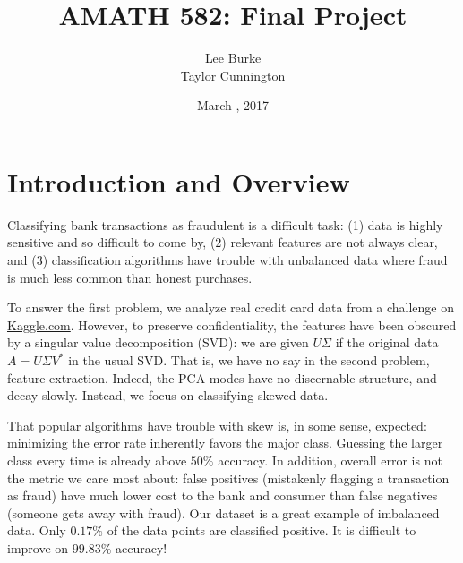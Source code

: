 \documentclass{article}
\title{AMATH 582: Final Project}
\date{March \nth{16}, 2017}
\author{Lee Burke \\ Taylor Cunnington}
\begin{document}
\maketitle
{}
\section{Introduction and Overview}
Classifying bank transactions as fraudulent is a difficult task: (1) data is highly sensitive and so difficult to come by, (2) relevant features are not always clear, and (3) classification algorithms have trouble with unbalanced data where fraud is much less common than honest purchases.

To answer the first problem, we analyze real credit card data from a challenge on \href{kaggle.com}{Kaggle.com}. However, to preserve confidentiality, the features have been obscured by a singular value decomposition (SVD): we are given $U\Sigma$ if the original data $A=U\Sigma V^\ast$ in the usual SVD. That is, we have no say in the second problem, feature extraction. Indeed, the PCA modes have no discernable structure, and decay slowly. Instead, we focus on classifying skewed data.

That popular algorithms have trouble with skew is, in some sense, expected: minimizing the error rate inherently favors the major class. Guessing the larger class every time is already above $50\%$ accuracy. In addition, overall error is not the metric we care most about: false positives (mistakenly flagging a transaction as fraud) have much lower cost to the bank and consumer than false negatives (someone gets away with fraud). Our dataset is a great example of imbalanced data. Only $0.17\%$ of the data points are classified positive. It is difficult to improve on $99.83\%$ accuracy!
\end{document}
